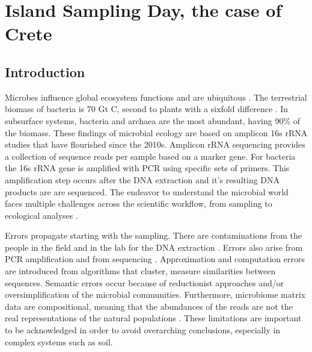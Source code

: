% 
% 


\chapter{Island Sampling Day, the case of Crete}
\label{cha:isd-crete-soil}


\section{Introduction}\label{intro_isd}

Microbes influence global ecosystem functions \parencite{falkowski2008microbial}
and are ubiquitous \parencite{delgado2016microbial}. The terrestrial biomass of bacteria is
70 Gt C, second to plants with a sixfold difference \parencite{bar2018biomass}. In subsurface systems, bacteria and
archaea are the most abundant, having 90\% of the biomass. These findings of microbial
ecology are based on amplicon 16s rRNA studies that have flourished since the
2010s.
Amplicon rRNA sequencing provides a collection of sequence reads per sample
based on a marker gene. For bacteria the 16s rRNA gene is amplified with PCR 
using specific sets of primers.
This amplification step occurs after the DNA extraction and it's resulting DNA products
are are sequenced.
The endeavor to understand the microbial world faces multiple challenges
across the scientific workflow, from sampling to ecological analyses \parencite{Lee2012}.

Errors propagate starting with the sampling. There are contaminations from the
people in the field and in the lab for the DNA extraction \parencite{EISENHOFER2019105}. 
Errors also arise from PCR amplification and from sequencing \parencite{Schloss2011, Schimer2015}.
Approximation and computation errors are introduced from algorithms that cluster, measure similarities between
sequences. Semantic errors occur because of reductionist approaches and/or oversimplification
of the microbial communities. Furthermore, microbiome matrix data are compositional, 
meaning that the abundances of the reads are not the real representations of the natural populations \parencite{Gloor2017}.
These limitations are important to be acknowledged in order to avoid overarching conclusions,
especially in complex systems such as soil.

